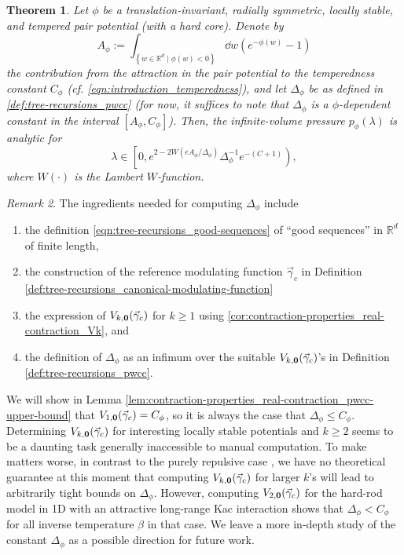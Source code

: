 \documentclass[11pt]{article}
\newcommand{\R}{\mathbb R}
\newcommand{\pwcc}{\Delta_{\phi}}
\newcommand{\aconst}{A_{\phi}}
\newcommand{\lsconst}{C}
\newcommand{\set}[1]{\left\{#1\right\}}
\numberwithin{equation}{section}
\theoremstyle{plain}
\newtheorem{theorem}{Theorem}[section]
\theoremstyle{definition}
\theoremstyle{remark}
\newtheorem{remark}[theorem]{Remark}
\begin{document}
\begin{theorem}
\label{thm:analyticity}
Let $\phi$ be a translation-invariant, radially symmetric, locally stable, and tempered pair potential (with a hard core).
Denote by
\begin{equation}
\label{eqn:attraction-constant}
\aconst:=\int_{\set{w\in\R^{d}\mid\phi(w)<0}}\dd{w}(e^{-\phi(w)}-1)
\end{equation}
the contribution from the attraction in the pair potential to the temperedness constant $C_{\phi}$ (cf. \eqref{eqn:introduction_temperedness}), and let $\pwcc$ be as defined in \eqref{def:tree-recursions_pwcc} (for now, it suffices to note that $\pwcc$ is a $\phi$-dependent constant in the interval $[\aconst,C_{\phi}]$).
Then, the infinite-volume pressure $p_{\phi}(\lambda)$ is analytic for 
\begin{equation}
\lambda\in\left[0,e^{2-2W(e\aconst/\pwcc)}\pwcc^{-1}e^{-(\lsconst+1)}\right),
\end{equation}
where $W(\cdot)$ is the Lambert $W$-function.
\end{theorem}

\begin{remark}
The ingredients needed for computing $\pwcc$ include 
\begin{enumerate}
\item the definition \eqref{eqn:tree-recursions_good-sequences} of ``good sequences'' in $\R^{d}$ of finite length, 
\item the construction of the reference modulating function $\vec{\gamma}_{c}$ in Definition \ref{def:tree-recursions_canonical-modulating-function}
\item the expression of $V_{k,\vb{0}}(\vec{\gamma}_{c})$ for $k\ge 1$ using \eqref{cor:contraction-properties_real-contraction_Vk}, and 
\item the definition of $\pwcc$ as an infimum over the suitable $V_{k,\vb{0}}(\vec{\gamma}_{c})$'s in Definition \ref{def:tree-recursions_pwcc}.
\end{enumerate}
We will show in Lemma \ref{lem:contraction-properties_real-contraction_pwcc-upper-bound} that $V_{1,\vb{0}}(\vec{\gamma}_{c})=C_{\phi}$, so it is always the case that $\pwcc\le C_{\phi}$.
Determining $V_{k,\vb{0}}(\vec{\gamma}_{c})$ for interesting locally stable potentials and $k\ge 2$ seems to be a daunting task generally inaccessible to manual computation.
To make matters worse, in contrast to the purely repulsive case \cite[Lemma 9]{michelen2023analyticity}, we have no theoretical guarantee at this moment that computing $V_{k,\vb{0}}(\vec{\gamma}_{c})$ for larger $k$'s will lead to arbitrarily tight bounds on $\pwcc$.
However, computing $V_{2,\vb{0}}(\vec{\gamma}_{c})$ for the hard-rod model in 1D with an attractive long-range Kac interaction shows that $\pwcc<C_{\phi}$ for all inverse temperature $\beta$ in that case.
We leave a more in-depth study of the constant $\pwcc$ as a possible direction for future work.
\end{remark}
\end{document}
